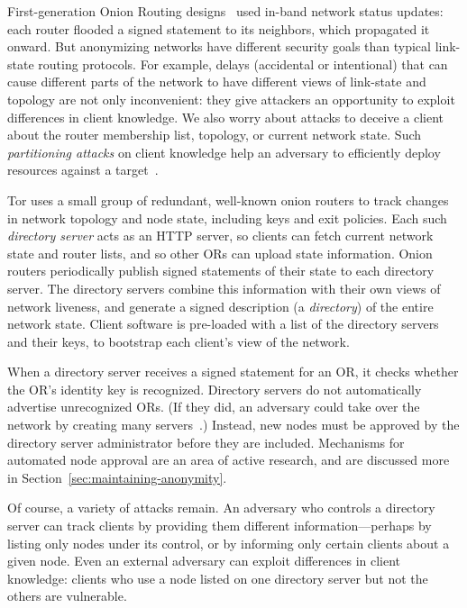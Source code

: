 \documentclass[twocolumn]{article}
\begin{document}
First-generation Onion Routing designs~\cite{freedom2-arch,or-jsac98} used
in-band network status updates: each router flooded a signed statement
to its neighbors, which propagated it onward. But anonymizing networks
have different security goals than typical link-state routing protocols.
For example, delays (accidental or intentional)
that can cause different parts of the network to have different views
of link-state and topology are not only inconvenient: they give
attackers an opportunity to exploit differences in client knowledge.
We also worry about attacks to deceive a
client about the router membership list, topology, or current network
state. Such \emph{partitioning attacks} on client knowledge help an
adversary to efficiently deploy resources
against a target~\cite{minion-design}.

Tor uses a small group of redundant, well-known onion routers to
track changes in network topology and node state, including keys and
exit policies.  Each such \emph{directory server} acts as an HTTP
server, so clients can fetch current network state
and router lists, and so other ORs can upload
state information.  Onion routers periodically publish signed
statements of their state to each directory server. The directory servers
combine this information with their own views of network liveness,
and generate a signed description (a \emph{directory}) of the entire
network state. Client software is
pre-loaded with a list of the directory servers and their keys,
to bootstrap each client's view of the network.

When a directory server receives a signed statement for an OR, it
checks whether the OR's identity key is recognized. Directory
servers do not automatically advertise unrecognized ORs. (If they did,
an adversary could take over the network by creating many
servers~\cite{sybil}.) Instead, new nodes must be approved by the
directory
server administrator before they are included. Mechanisms for automated
node approval are an area of active research, and are discussed more
in Section~\ref{sec:maintaining-anonymity}.

Of course, a variety of attacks remain. An adversary who controls
a directory server can track clients by providing them different
information---perhaps by listing only nodes under its control, or by
informing only certain clients about a given node. Even an external
adversary can exploit differences in client knowledge: clients who use
a node listed on one directory server but not the others are vulnerable.
\end{document}

